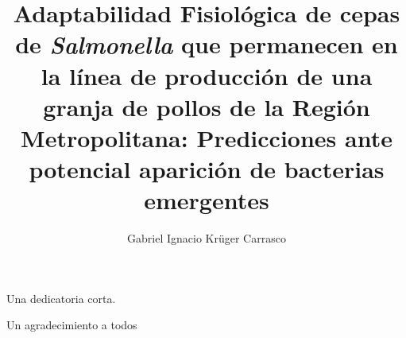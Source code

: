 \documentclass{thesis}
\title{Adaptabilidad Fisiológica de cepas de \emph{Salmonella} que permanecen en la línea de producción de una granja de pollos de la Región Metropolitana: Predicciones ante potencial aparición de bacterias emergentes}
\author{Gabriel Ignacio Krüger Carrasco}
\begin{document}
\frontmatter
\maketitle

\begin{dedicatoria}
Una dedicatoria corta.
\end{dedicatoria}

\begin{thanks}
Un agradecimiento a todos
\end{thanks}

\tableofcontents
\listoftables
\listoffigures
\listofalgorithms

\mainmatter









\printbibliography
\end{document}
